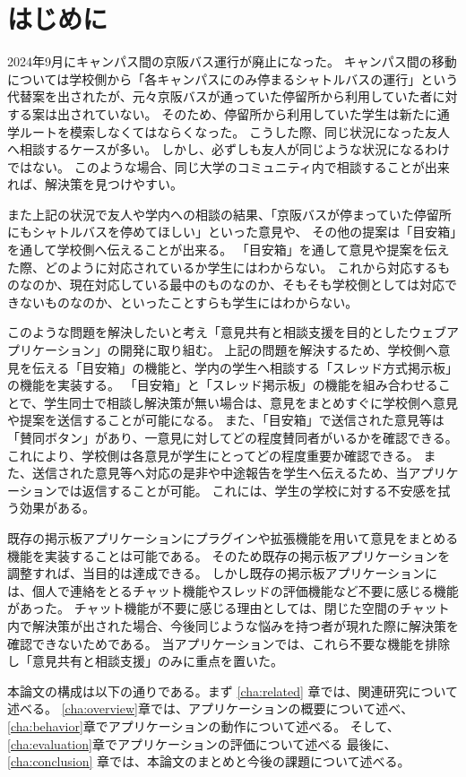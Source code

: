 \documentclass[main]{subfiles}
\begin{document}
\chapter{はじめに}
\label{cha:intro}

2024年9月にキャンパス間の京阪バス運行が廃止になった。
キャンパス間の移動については学校側から「各キャンパスにのみ停まるシャトルバスの運行」という代替案を出されたが、元々京阪バスが通っていた停留所から利用していた者に対する案は出されていない。
そのため、停留所から利用していた学生は新たに通学ルートを模索しなくてはならくなった。
こうした際、同じ状況になった友人へ相談するケースが多い。
しかし、必ずしも友人が同じような状況になるわけではない。
このような場合、同じ大学のコミュニティ内で相談することが出来れば、解決策を見つけやすい。

また上記の状況で友人や学内への相談の結果、「京阪バスが停まっていた停留所にもシャトルバスを停めてほしい」といった意見や、
その他の提案は「目安箱」を通して学校側へ伝えることが出来る。
「目安箱」を通して意見や提案を伝えた際、どのように対応されているか学生にはわからない。
これから対応するものなのか、現在対応している最中のものなのか、そもそも学校側としては対応できないものなのか、といったことすらも学生にはわからない。

このような問題を解決したいと考え「意見共有と相談支援を目的としたウェブアプリケーション」の開発に取り組む。
上記の問題を解決するため、学校側へ意見を伝える「目安箱」の機能と、学内の学生へ相談する「スレッド方式掲示板」の機能を実装する。
「目安箱」と「スレッド掲示板」の機能を組み合わせることで、学生同士で相談し解決策が無い場合は、意見をまとめすぐに学校側へ意見や提案を送信することが可能になる。
また、「目安箱」で送信された意見等は「賛同ボタン」があり、一意見に対してどの程度賛同者がいるかを確認できる。
これにより、学校側は各意見が学生にとってどの程度重要か確認できる。
また、送信された意見等へ対応の是非や中途報告を学生へ伝えるため、当アプリケーションでは返信することが可能。
これには、学生の学校に対する不安感を拭う効果がある。

既存の掲示板アプリケーションにプラグインや拡張機能を用いて意見をまとめる機能を実装することは可能である。
そのため既存の掲示板アプリケーションを調整すれば、当目的は達成できる。
しかし既存の掲示板アプリケーションには、個人で連絡をとるチャット機能やスレッドの評価機能など不要に感じる機能があった。%
チャット機能が不要に感じる理由としては、閉じた空間のチャット内で解決策が出された場合、今後同じような悩みを持つ者が現れた際に解決策を確認できないためである。
当アプリケーションでは、これら不要な機能を排除し「意見共有と相談支援」のみに重点を置いた。

本論文の構成は以下の通りである。まず \ref{cha:related} 章では、関連研究について述べる。
\ref{cha:overview}章では、アプリケーションの概要について述べ、
\ref{cha:behavior}章でアプリケーションの動作について述べる。
そして、\ref{cha:evaluation}章でアプリケーションの評価について述べる
最後に、\ref{cha:conclusion} 章では、本論文のまとめと今後の課題について述べる。
\end{document}
